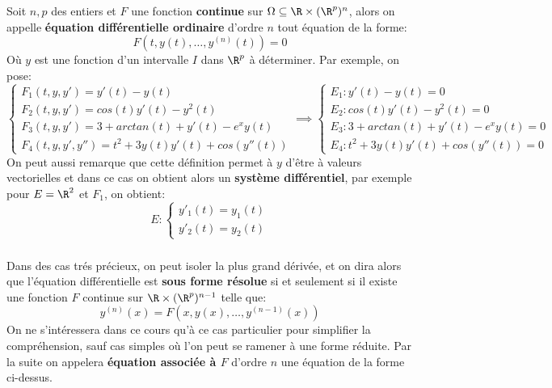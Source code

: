 \chapter*{}
Soit \(n, p\) des entiers et \(F\) une fonction \textbf{continue} sur \(\Omega \subseteq \R \times (\R^{p})^n\), alors on appelle \textbf{équation différentielle ordinaire} d'ordre \(n\) tout équation de la forme:
\[
   F(t, y(t), \ldots, y^{(n)}(t)) = 0
\]
Où \(y\) est une fonction d'un intervalle \( I \) dans \(\R^p\) à déterminer. Par exemple, on pose:
\[
   \begin{cases}
      F_1(t, y, y') = y'(t) - y(t)\\
      F_2(t, y, y') = cos(t)y'(t) - y^2(t)\\
      F_3(t, y, y') = 3 + arctan(t) + y'(t) - e^xy(t)\\ 
      F_4(t, y, y', y'') = t^2 + 3y(t)y'(t) + cos(y''(t))
   \end{cases} \implies
   \begin{cases}
      E_1 : y'(t) - y(t) = 0 \\
      E_2 : cos(t)y'(t) - y^2(t) = 0 \\
      E_3 : 3 + arctan(t) + y'(t) - e^xy(t) = 0 \\
      E_4 : t^2 + 3y(t)y'(t) + cos(y''(t)) = 0
   \end{cases}
\]
On peut aussi remarque que cette définition permet à \(y\) d'être à valeurs vectorielles et dans ce cas on obtient alors un \textbf{système différentiel}, par exemple pour \(E = \R^2\) et \(F_1\), on obtient:
\[
   E : \begin{cases}
      y'_1(t) = y_1(t)\\
      y'_2(t) = y_2(t)
   \end{cases}
\]
\subsection*{}
Dans des cas trés précieux, on peut isoler la plus grand dérivée, et on dira alors que l'équation différentielle est \textbf{sous forme résolue} si et seulement si il existe une fonction \(F\) continue sur \(\R \times (\R^p)^{n-1}\) telle que:
\[
   y^{(n)}(x) = F(x, y(x), \ldots, y^{(n-1)}(x))
\]
On ne s'intéressera dans ce cours qu'à ce cas particulier pour simplifier la compréhension, sauf cas simples où l'on peut se ramener à une forme réduite. Par la suite on appelera \textbf{équation associée à \( F \)} d'ordre \( n \) une équation de la forme ci-dessus.
